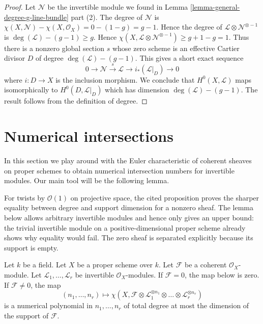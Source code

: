 \begin{proof}
Let $\mathcal{N}$ be the invertible module we found in
Lemma \ref{lemma-general-degree-g-line-bundle} part (2).
The degree of $\mathcal{N}$ is
$\chi(X, \mathcal{N}) - \chi(X, \mathcal{O}_X) = 0 - (1 - g) = g - 1$.
Hence the degree of $\mathcal{L} \otimes \mathcal{N}^{\otimes - 1}$
is $\deg(\mathcal{L}) - (g - 1) \geq g$.
Hence
$\chi(X, \mathcal{L} \otimes \mathcal{N}^{\otimes -1}) \geq g + 1 - g = 1$.
Thus there is a nonzero global section $s$ whose zero scheme is an
effective Cartier divisor $D$ of degree $\deg(\mathcal{L}) - (g - 1)$.
This gives a short exact sequence
$$
0 \to \mathcal{N} \xrightarrow{s} \mathcal{L} \to i_*(\mathcal{L}|_D) \to 0
$$
where $i : D \to X$ is the inclusion morphism. We conclude that
$H^0(X, \mathcal{L})$ maps isomorphically to $H^0(D, \mathcal{L}|_D)$
which has dimension $\deg(\mathcal{L}) - (g - 1)$. The result follows
from the definition of degree.
\end{proof}






\section{Numerical intersections}
\label{section-num}

\noindent
In this section we play around with the Euler characteristic of
coherent sheaves on proper schemes to obtain numerical intersection
numbers for invertible modules. Our main tool will be the following
lemma.

\begin{lemma}
\label{lemma-numerical-polynomial-from-euler}
\begin{reference}
\cite[Chapter III, \S 6, no. 81, Proposition 6, pp. 276--277]{FAC}
\end{reference}
\begin{history}
For twists by $\mathcal{O}(1)$ on projective space, the cited proposition
proves the sharper equality between degree and support dimension for a
nonzero sheaf. The lemma below allows arbitrary invertible modules and hence
only gives an upper bound: the trivial invertible module on a
positive-dimensional proper scheme already shows why equality would fail.
The zero sheaf is separated explicitly because its support is empty.
\end{history}
Let $k$ be a field. Let $X$ be a proper scheme over $k$. Let $\mathcal{F}$
be a coherent $\mathcal{O}_X$-module. Let
$\mathcal{L}_1, \ldots, \mathcal{L}_r$ be invertible $\mathcal{O}_X$-modules.
If $\mathcal{F} = 0$, the map below is zero. If $\mathcal{F} \not = 0$, the map
$$
(n_1, \ldots, n_r) \longmapsto
\chi(X, \mathcal{F} \otimes
\mathcal{L}_1^{\otimes n_1} \otimes \ldots \otimes
\mathcal{L}_r^{\otimes n_r})
$$
is a numerical polynomial in $n_1, \ldots, n_r$ of total degree at
most the dimension of the support of $\mathcal{F}$.
\end{lemma}

